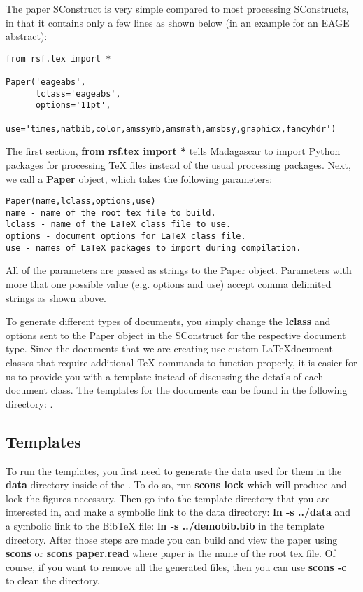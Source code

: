 The paper SConstruct is very simple compared to most processing SConstructs, in that it contains only a few lines as shown below (in an example for an EAGE abstract):
\lstset{language=python,showstringspaces=false}
\begin{lstlisting}
from rsf.tex import *

Paper('eageabs',
      lclass='eageabs',
      options='11pt',
      use='times,natbib,color,amssymb,amsmath,amsbsy,graphicx,fancyhdr')
\end{lstlisting}

The first section, \textbf{from rsf.tex import *} tells Madagascar to import Python packages for processing TeX files instead of the usual processing packages.  Next, we call a \textbf{Paper} object, which takes the following parameters:
\begin{verbatim}
Paper(name,lclass,options,use)
name - name of the root tex file to build.
lclass - name of the LaTeX class file to use.
options - document options for LaTeX class file.
use - names of LaTeX packages to import during compilation.
\end{verbatim}
All of the parameters are passed as strings to the Paper object.  Parameters with more that one possible value (e.g. options and use) accept comma delimited strings as shown above.  

To generate different types of documents, you simply change the \textbf{lclass} and options sent to the Paper object in the SConstruct for the respective document type.  Since the documents that we are creating use custom \LaTeX document classes that require additional TeX commands to function properly, it is easier for us to provide you with a template instead of discussing the details of each document class.  The templates for the documents can be found in the following directory: \textbf{\exampledir}.  

\subsection{Templates}

To run the templates, you first need to generate the data used for them in the \textbf{data} directory inside of the \textbf{\exampledir}.  To do so, run \textbf{scons lock} which will produce and lock the figures necessary.  Then go into the template directory that you are interested in, and make a symbolic link to the data directory: \textbf{ln -s ../data} and a symbolic link to the BibTeX file: \textbf{ln -s ../demobib.bib} in the template directory.  After those steps are made you can build and view the paper using \textbf{scons} or \textbf{scons paper.read} where paper is the name of the root tex file.  Of course, if you want to remove all the generated files, then you can use \textbf{scons -c} to clean the directory.

